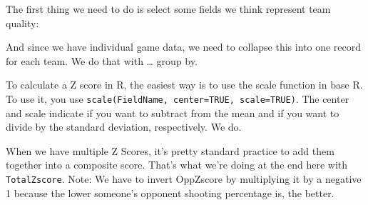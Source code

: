\documentclass[]{book}
\newenvironment{Shaded}{\begin{snugshade}}{\end{snugshade}}
\newcommand{\KeywordTok}[1]{\textcolor[rgb]{0.13,0.29,0.53}{\textbf{#1}}}
\newcommand{\DataTypeTok}[1]{\textcolor[rgb]{0.13,0.29,0.53}{#1}}
\newcommand{\StringTok}[1]{\textcolor[rgb]{0.31,0.60,0.02}{#1}}
\newcommand{\OperatorTok}[1]{\textcolor[rgb]{0.81,0.36,0.00}{\textbf{#1}}}
\newcommand{\NormalTok}[1]{#1}
\begin{document}
The first thing we need to do is select some fields we think represent
team quality:

\begin{Shaded}
\end{Shaded}

And since we have individual game data, we need to collapse this into
one record for each team. We do that with \ldots{} group by.

\begin{Shaded}
\end{Shaded}

To calculate a Z score in R, the easiest way is to use the scale
function in base R. To use it, you use
\texttt{scale(FieldName,\ center=TRUE,\ scale=TRUE)}. The center and
scale indicate if you want to subtract from the mean and if you want to
divide by the standard deviation, respectively. We do.

When we have multiple Z Scores, it's pretty standard practice to add
them together into a composite score. That's what we're doing at the end
here with \texttt{TotalZscore}. Note: We have to invert OppZscore by
multiplying it by a negative 1 because the lower someone's opponent
shooting percentage is, the better.
\end{document}
